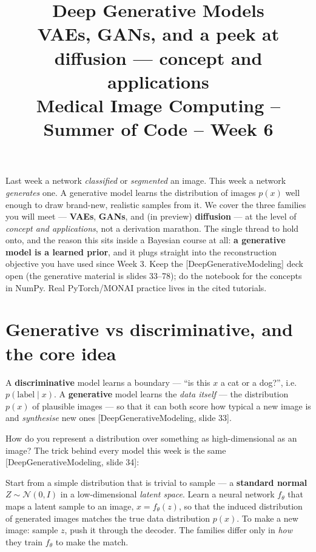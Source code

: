 \documentclass[11pt]{article}
\title{\textbf{Deep Generative Models}\\[2pt]
\large VAEs, GANs, and a peek at diffusion --- concept and applications\\[6pt]
\normalsize Medical Image Computing -- Summer of Code -- Week 6}
\author{}
\date{}
\newcommand{\deck}[1]{\textsf{\small[#1]}}
\begin{document}
\maketitle
\vspace{-2.2em}

\begin{keybox}
Last week a network \emph{classified} or \emph{segmented} an image. This week a
network \emph{generates} one. A generative model learns the distribution of
images $p(x)$ well enough to draw brand-new, realistic samples from it. We cover
the three families you will meet --- \textbf{VAEs}, \textbf{GANs}, and (in
preview) \textbf{diffusion} --- at the level of \emph{concept and applications},
not a derivation marathon. The single thread to hold onto, and the reason this
sits inside a Bayesian course at all: \textbf{a generative model is a learned
prior}, and it plugs straight into the reconstruction objective you have used
since Week 3. Keep the \deck{DeepGenerativeModeling} deck open (the generative
material is slides 33--78); do the notebook for the concepts in NumPy. Real
PyTorch/MONAI practice lives in the cited tutorials.
\end{keybox}

\tableofcontents
\bigskip

\section{Generative vs discriminative, and the core idea}

A \textbf{discriminative} model learns a boundary --- ``is this $x$ a cat or a
dog?'', i.e.\ $p(\text{label}\mid x)$. A \textbf{generative} model learns the
\emph{data itself} --- the distribution $p(x)$ of plausible images --- so that it
can both score how typical a new image is and \emph{synthesise} new ones
\deck{DeepGenerativeModeling, slide 33}.

How do you represent a distribution over something as high-dimensional as an
image? The trick behind every model this week is the same
\deck{DeepGenerativeModeling, slide 34}:

\begin{keybox}
Start from a simple distribution that is trivial to sample --- a
\textbf{standard normal} $Z\sim\mathcal{N}(0,I)$ in a low-dimensional
\emph{latent space}. Learn a neural network $f_\theta$ that maps a latent sample
to an image, $x = f_\theta(z)$, so that the induced distribution of generated
images matches the true data distribution $p(x)$. To make a new image: sample
$z$, push it through the decoder. The families differ only in \emph{how} they
train $f_\theta$ to make the match.
\end{keybox}
\end{document}
